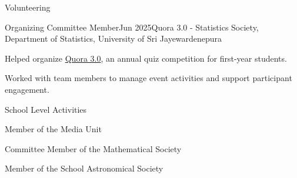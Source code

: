 \documentclass{resume} %
\begin{document}
		\hypersetup{
		colorlinks=true,
		linkcolor=blue,
		urlcolor=blue
	}
	
	\begin{rSection}{Volunteering} 
		
		\begin{rSubsection}{Organizing Committee Member}{Jun 2025}{Quora 3.0 - Statistics Society, Department of Statistics, University of Sri Jayewardenepura}{}
			\item Helped organize \href{https://www.linkedin.com/feed/update/urn:li:activity:7339490380205215744/}{Quora 3.0}, an annual quiz competition for first-year students.
			\item Worked with team members to manage event activities and support participant engagement.
		\end{rSubsection}
		
	\end{rSection}
	
	
	   	\hypersetup{
	   	colorlinks=true,
	   	linkcolor=black,
	   	urlcolor=black
	   }



	\begin{rSection}{School Level Activities} 
		
		\begin{rSubsection}{}{}{}{}
			\item Member of the Media Unit \href{https://github.com/amalirajapaksha/CV/blob/main/School_level.jpeg}{\faExternalLink}
			\item Committee Member of the Mathematical Society
			\item Member of the School Astronomical Society
		\end{rSubsection}
		
	\end{rSection}
	
	
	\hypersetup{
		colorlinks=true,
		linkcolor=black,
		urlcolor=black
	}
	
\end{document}
